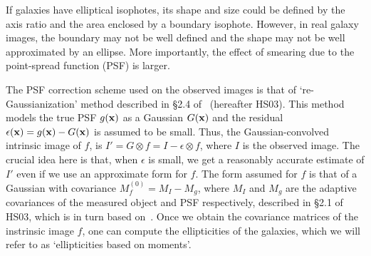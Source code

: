 \documentclass[twocolumn,useAMS,usenatbib]{mn2e}
\newcommand{\rachel}[1]{{\textcolor{red}{#1}}}
\newcommand{\arun}[1]{{\textcolor{blue}{#1}}}
\newcommand{\rmd}{\mathrm{d}}
\begin{document}
If galaxies have elliptical isophotes, its shape and size could be defined by the axis ratio and the area enclosed by a boundary isophote. However, in real galaxy images,
the boundary may not be well defined and the shape may not be well approximated by an ellipse. More importantly, the effect of smearing due to the point-spread function (PSF) is larger. 
% 
% 

The PSF correction scheme used on the observed images is that of `re-Gaussianization' method described in \S 2.4 of~\cite{HS03} (hereafter HS03).
This method models the true PSF $g({\bf x})$ as a Gaussian $G({\bf x})$ and the residual $\epsilon({\bf x}) = g({\bf x}) - G({\bf x})$ is assumed to be small. Thus, the Gaussian-convolved
intrinsic image of $f$, is $I' = G\otimes f = I - \epsilon \otimes f$, where $I$ is the observed image. The crucial idea here is that, when $\epsilon$ is small, we get a reasonably accurate
estimate of $I'$ even if we use an approximate form for $f$. The form assumed for $f$ is that of a Gaussian with covariance $M_f^{(0)} = M_I - M_g$, where $M_I$ and $M_g$ are the adaptive
covariances of the measured object and PSF respectively, described in \S 2.1 of HS03, which is in turn based on~\cite{BJ02}. Once we obtain the covariance matrices of the instrinsic image $f$, one can compute the ellipticities 
of the galaxies, which we will refer to as `ellipticities based on moments'.
\end{document}

